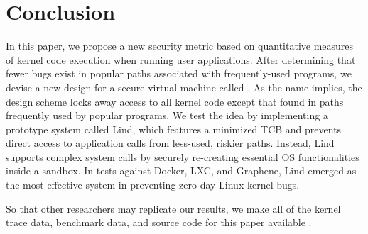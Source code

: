 \section{Conclusion}
\label{sec.conclusion}

In this paper, we propose a new security metric based on quantitative measures of kernel code execution when running user applications.
After determining that fewer bugs exist in popular paths associated with frequently-used
programs, we devise a new design for a secure virtual machine called \lip.
As the name implies, the design scheme locks away access to all
kernel code except that found in paths frequently used by
popular programs. We test the \lip idea by implementing a prototype system
called Lind, which features a minimized TCB and prevents direct access to application
calls from less-used, riskier paths.
Instead, Lind supports complex system calls by securely re-creating
essential OS functionalities inside a sandbox.
In tests against Docker, LXC, and Graphene, Lind emerged as the most effective system in preventing
zero-day Linux kernel bugs.

So that other researchers may replicate our results, we make all of the kernel
trace data, benchmark data, and source code for this paper available \redact.
